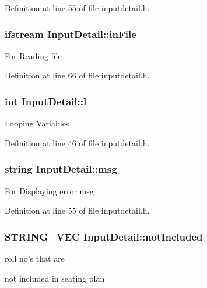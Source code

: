 Definition at line 55 of file inputdetail.\-h.

\hypertarget{classInputDetail_a4c62c1934fbfcdcc8e2afaee44a87c15}{
\subsubsection[{in\-File}]{\setlength{\rightskip}{0pt plus 5cm}ifstream Input\-Detail\-::in\-File\hspace{0.3cm}{\ttfamily [protected]}}}\label{classInputDetail_a4c62c1934fbfcdcc8e2afaee44a87c15}
For Reading file 

Definition at line 66 of file inputdetail.\-h.

\hypertarget{classInputDetail_a3a950727518c2f6ed3c068125a037b9e}{
\subsubsection[{l}]{\setlength{\rightskip}{0pt plus 5cm}int Input\-Detail\-::l\hspace{0.3cm}{\ttfamily [protected]}}}\label{classInputDetail_a3a950727518c2f6ed3c068125a037b9e}
Looping Variables 

Definition at line 46 of file inputdetail.\-h.

\hypertarget{classInputDetail_a1abb16cd695678c3fa05e3c812823fee}{
\subsubsection[{msg}]{\setlength{\rightskip}{0pt plus 5cm}string Input\-Detail\-::msg\hspace{0.3cm}{\ttfamily [protected]}}}\label{classInputDetail_a1abb16cd695678c3fa05e3c812823fee}
For Displaying error msg 

Definition at line 55 of file inputdetail.\-h.

\hypertarget{classInputDetail_aba862d64d7f84a385e528d0daf42e9fc}{
\subsubsection[{not\-Included}]{\setlength{\rightskip}{0pt plus 5cm}S\-T\-R\-I\-N\-G\-\_\-\-V\-E\-C Input\-Detail\-::not\-Included\hspace{0.3cm}{\ttfamily [protected]}}}\label{classInputDetail_aba862d64d7f84a385e528d0daf42e9fc}
\begin{DoxyVerb}                             roll no's that are 
\end{DoxyVerb}
 not included in seating plan 

